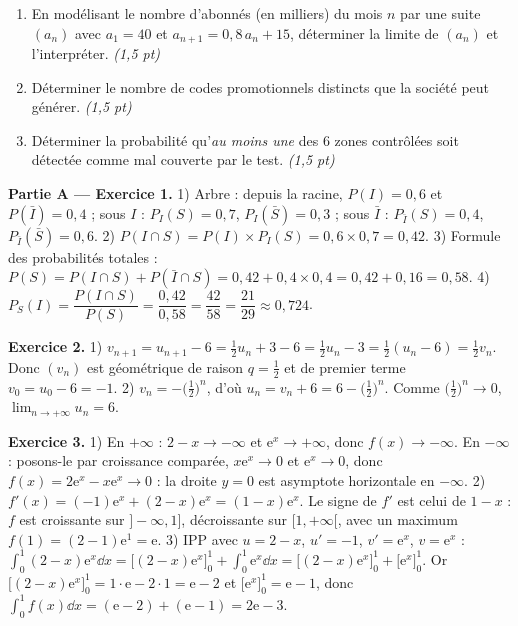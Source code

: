 \begin{enumerate}[label=\textbf{Tâche \arabic*.},leftmargin=2.4em]
\item En modélisant le nombre d'abonnés (en milliers) du mois $n$ par une suite $(a_n)$
avec $a_1=40$ et $a_{n+1}=0{,}8\,a_n+15$, déterminer la limite de $(a_n)$ et l'interpréter. \hfill\textit{(1,5 pt)}
\item Déterminer le nombre de codes promotionnels distincts que la société peut générer. \hfill\textit{(1,5 pt)}
\item Déterminer la probabilité qu'\emph{au moins une} des $6$ zones contrôlées soit
détectée comme mal couverte par le test. \hfill\textit{(1,5 pt)}
\end{enumerate}
\par{}


\noindent\textbf{Partie A — Exercice 1.}
1) Arbre : depuis la racine, $P(I)=0{,}6$ et $P(\bar I)=0{,}4$ ; sous $I$ : $P_I(S)=0{,}7$,
$P_I(\bar S)=0{,}3$ ; sous $\bar I$ : $P_{\bar I}(S)=0{,}4$, $P_{\bar I}(\bar S)=0{,}6$.
2) $P(I\cap S)=P(I)\times P_I(S)=0{,}6\times0{,}7=0{,}42$.
3) Formule des probabilités totales : $P(S)=P(I\cap S)+P(\bar I\cap S)=0{,}42+0{,}4\times0{,}4=0{,}42+0{,}16=0{,}58$.
4) $P_S(I)=\dfrac{P(I\cap S)}{P(S)}=\dfrac{0{,}42}{0{,}58}=\dfrac{42}{58}=\dfrac{21}{29}\approx0{,}724$.

\noindent\textbf{Exercice 2.}
1) $v_{n+1}=u_{n+1}-6=\tfrac12u_n+3-6=\tfrac12u_n-3=\tfrac12(u_n-6)=\tfrac12v_n$. Donc $(v_n)$
est géométrique de raison $q=\tfrac12$ et de premier terme $v_0=u_0-6=-1$.
2) $v_n=-\big(\tfrac12\big)^n$, d'où $u_n=v_n+6=6-\big(\tfrac12\big)^n$. Comme
$\big(\tfrac12\big)^n\to0$, $\displaystyle\lim_{n\to+\infty}u_n=6$.

\noindent\textbf{Exercice 3.}
1) En $+\infty$ : $2-x\to-\infty$ et $\mathrm e^x\to+\infty$, donc $f(x)\to-\infty$.
En $-\infty$ : posons-le par croissance comparée, $x\mathrm e^x\to0$ et $\mathrm e^x\to0$,
donc $f(x)=2\mathrm e^x-x\mathrm e^x\to0$ : la droite $y=0$ est asymptote horizontale en $-\infty$.
2) $f'(x)=(-1)\mathrm e^x+(2-x)\mathrm e^x=(1-x)\mathrm e^x$. Le signe de $f'$ est celui de
$1-x$ : $f$ est croissante sur $]-\infty,1]$, décroissante sur $[1,+\infty[$, avec un
maximum $f(1)=(2-1)\mathrm e^1=\mathrm e$.
3) IPP avec $u=2-x$, $u'=-1$, $v'=\mathrm e^x$, $v=\mathrm e^x$ :
$\int_0^1(2-x)\mathrm e^x\dd x=\big[(2-x)\mathrm e^x\big]_0^1+\int_0^1\mathrm e^x\dd x
=\big[(2-x)\mathrm e^x\big]_0^1+\big[\mathrm e^x\big]_0^1$.
Or $\big[(2-x)\mathrm e^x\big]_0^1=1\cdot\mathrm e-2\cdot1=\mathrm e-2$ et $\big[\mathrm e^x\big]_0^1=\mathrm e-1$,
donc $\int_0^1f(x)\dd x=(\mathrm e-2)+(\mathrm e-1)=2\mathrm e-3$.

